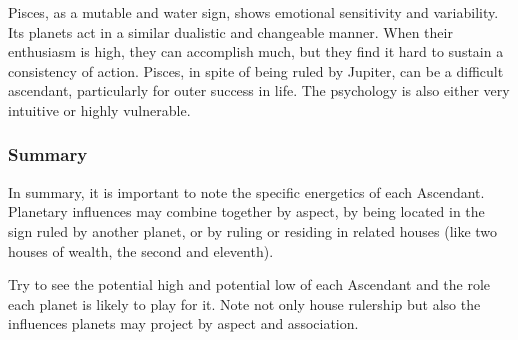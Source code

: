 Pisces, as a mutable and water sign, shows emotional sensitivity and variability. Its planets act in a similar dualistic and changeable manner. When their enthusiasm is high, they can accomplish much, but they find it hard to sustain a consistency of action. Pisces, in spite of being ruled by Jupiter, can be a difficult ascendant, particularly for outer success in life. The psychology is also either very intuitive or highly vulnerable.

 

\subsubsection{Summary}

In summary, it is important to note the specific energetics of each Ascendant. Planetary influences may combine together by aspect, by being located in the sign ruled by another planet, or by ruling or residing in related houses (like two houses of wealth, the second and eleventh).

 

Try to see the potential high and potential low of each Ascendant and the role each planet is likely to play for it. Note not only house rulership but also the influences planets may project by aspect and association.